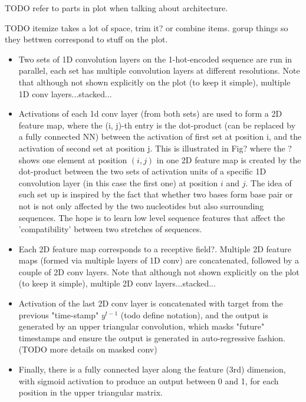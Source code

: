 \documentclass{article}
\begin{document}

TODO refer to parts in plot when talking about architecture.

TODO itemize takes a lot of space, trim it? or combine items.
gorup things so they bettwen correspond to stuff on the plot.

\begin{itemize}

    \item Two sets of 1D convolution layers on the 1-hot-encoded sequence are run in parallel,
     each set has multiple convolution layers at different resolutions.
    Note that although not shown explicitly on the plot (to keep it simple), multiple 1D conv layers...stacked...

    \item Activations of each 1d conv layer (from both sets) are used to form a 2D feature map,
where the (i, j)-th entry is the dot-product (can be replaced by a fully connected NN) between the
activation of first set at position i, and the activation of second set at position j.
This is illustrated in Fig? where the ? shows one element at position $(i, j)$ in one
2D feature map is created by the dot-product between the
two sets of activation units of a specific 1D convolution layer (in this case the first one)
at position $i$ and $j$.
The idea of such set up is inspired by the fact that whether two bases form base pair or not
is not only affected by the two nucleotides but also surrounding sequences.
The hope is to learn low level sequence features that affect the 'compatibility'
between two stretches of sequences.

    \item Each 2D feature map corresponds to a receptive field?.
    Multiple 2D feature maps (formed via multiple layers of 1D conv) are concatenated,
followed by a couple of 2D conv layers.
Note that although not shown explicitly on the plot (to keep it simple), multiple 2D conv layers...stacked...



    \item  Activation of the last 2D conv layer is concatenated with target from the previous "time-stamp" $y^{t-1}$ (todo define notation),
and the output is generated by an upper triangular convolution,
which masks "future" timestamps and ensure the output is generated in auto-regressive fashion. (TODO more details on masked conv)

    \item Finally, there is a fully connected layer along the feature (3rd) dimension,
   with sigmoid activation to produce an output between 0 and 1,
    for each position in the upper triangular matrix.

\end{itemize}
\end{document}
